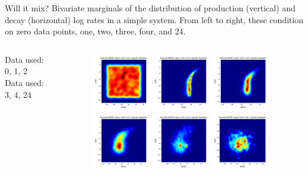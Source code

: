 \documentclass[12pt,a4paper,t,xcolor=dvipsnames,slidestop,compress,mathserif]{beamer}
\begin{document}
\begin{frame}{Will it mix?}
Bivariate marginals of the distribution of production (vertical) and decay (horizontal) log rates in a simple system. From left to right, these condition on zero data points, one, two, three, four, and 24.
\pause
\begin{columns}[c]
\begin{column}{0.17\textwidth}
Data used:\\ 0, 1, 2\\
\phantom{0}
\phantom{0}
Data used:\\ 3, 4, 24
\end{column}
\begin{column}{0.80\textwidth}

\includegraphics[height=1in,width=1in]{simple_million_stagewise_plots/dist0_contour_decay_prod.png}
\includegraphics[height=1in,width=1in]{simple_million_stagewise_plots/dist1_contour_decay_prod.png}
\includegraphics[height=1in,width=1in]{simple_million_stagewise_plots/dist2_contour_decay_prod.png}\\

\includegraphics[height=1in,width=1in]{simple_million_stagewise_plots/dist3_contour_decay_prod.png}
\includegraphics[height=1in,width=1in]{simple_million_stagewise_plots/dist4_contour_decay_prod.png}
\includegraphics[height=1in,width=1in]{simple_million_stagewise_plots/dist23_contour_decay_prod.png}


\end{column}
\end{columns}
\end{frame}
\end{document}

